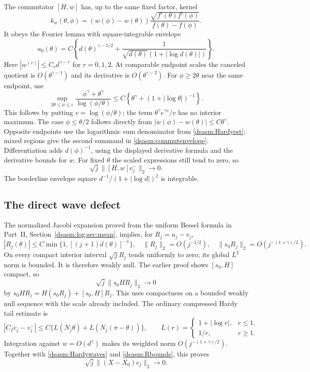 \documentclass[11pt,letterpaper]{article}
\theoremstyle{remark}\newtheorem{remark}[theorem]{Remark}
\newcommand{\eps}{\varepsilon}\newcommand{\HH}{\mathcal H}\newcommand{\one}{\mathbf1}
\begin{document}
The commutator $[H,w]$ has, up to the same fixed factor, kernel
\[
 k_w(\theta,\phi)=(w(\phi)-w(\theta))
       \frac{\sqrt{f'(\theta)f'(\phi)}}{f(\theta)-f(\phi)}.
\]
It obeys the Fourier lemma with square-integrable envelope
\begin{equation}\label{dsasm:commutenvelope}
 a_0(\theta)=C\left\{d(\theta)^{\gamma-1/2}
       +\frac1{\sqrt{d(\theta)}(1+|\log d(\theta)|)}\right\}.
\end{equation}
Here $|w^{(r)}|\le C_rd^{\gamma-r}$ for $r=0,1,2$.
At comparable endpoint scales the canceled quotient is
$O(\theta^{\gamma-1})$ and its derivative is
$O(\theta^{\gamma-2})$. For $\phi\ge2\theta$ near the same
endpoint, use
\[
 \sup_{2\theta\le\phi\le\eps}
 \frac{\phi^\gamma+\theta^\gamma}{\log(\phi/\theta)}
 \le C\left\{\theta^\gamma+(1+|\log\theta|)^{-1}\right\}.
\]
This follows by putting $v=\log(\phi/\theta)$; the term
$\theta^\gamma e^{\gamma v}/v$ has no interior maximum.
The case $\phi\le\theta/2$ follows directly from
$|w(\phi)-w(\theta)|\le C\theta^\gamma$. Opposite endpoints use
the logarithmic sum denominator from \eqref{dsasm:Hardyest}; mixed
regions give the second summand in \eqref{dsasm:commutenvelope}.
Differentiation adds $d(\phi)^{-1}$, using the displayed derivative
formula and the derivative bounds for $w$. For fixed $\theta$ the
scaled expressions still tend to zero, so
\begin{equation}\label{dsasm:commuterate}
 \sqrt j\|[H,w]v_j^-\|_2\to0.
\end{equation}
The borderline envelope square $d^{-1}/(1+|\log d|)^2$ is integrable.

\subsection{The direct wave defect}
The normalized Jacobi expansion proved from the uniform Bessel
formula in Part~II, Section~\ref{dsasm:log:sec:mean}, implies, for $R_j=u_j-v_j$,
\begin{equation}\label{dsasm:Rbounds}
 |R_j(\theta)|\le C\min\{1,[(j+1)d(\theta)]^{-1}\},\quad
 \|R_j\|_2=O(j^{-1/2}),\quad
 \|s_0R_j\|_2=O(j^{-(1+\gamma)/2}).
\end{equation}
On every compact interior interval $\sqrt jR_j$ tends uniformly
to zero; its global $L^2$ norm is bounded. It is therefore weakly
null. The earlier proof shows $[s_0,H]$ compact, so
\[
 \sqrt j\|s_0HR_j\|_2\to0
\]
by $s_0HR_j=H(s_0R_j)+[s_0,H]R_j$.
This uses compactness on a bounded weakly null sequence with the
scale already included.
The ordinary compressed Hardy tail estimate is
\[
 |C_Iv_j-v_j^-|\le C\{L(N_j\theta)+L(N_j(\pi-\theta))\},\qquad
 L(r)=\begin{cases}1+|\log r|,&r\le1,\\1/r,&r\ge1.\end{cases}
\]
Integration against $w=O(d^\gamma)$ makes its weighted norm
$O(j^{-(1+\gamma)/2})$. Together with \eqref{dsasm:Hardywaves} and
\eqref{dsasm:Rbounds}, this proves
\begin{equation}\label{dsasm:directdefect}
 \sqrt j\|(X-X_0)e_j\|_2\to0.
\end{equation}
\end{document}
